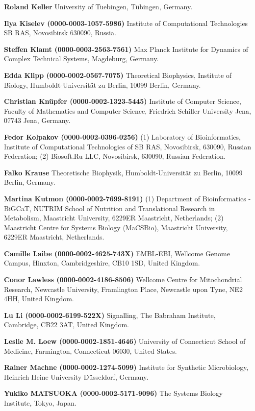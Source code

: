 \documentclass{sbml-paper}
\begin{document}
\textbf{Roland Keller} University of Tuebingen, Tübingen, Germany.

\textbf{Ilya Kiselev (0000-0003-1057-5986)} Institute of Computational Technologies SB RAS, Novosibirsk 630090, Russia.

\textbf{Steffen Klamt (0000-0003-2563-7561)} Max Planck Institute for Dynamics of Complex Technical Systems, Magdeburg, Germany.

\textbf{Edda Klipp (0000-0002-0567-7075)} Theoretical Biophysics, Institute of Biology, Humboldt-Universität zu Berlin, 10099 Berlin, Germany.

\textbf{Christian Knüpfer (0000-0002-1323-5445)} Institute of Computer Science, Faculty of Mathematics and Computer Science, Friedrich Schiller University Jena, 07743 Jena, Germany.

\textbf{Fedor Kolpakov (0000-0002-0396-0256)} (1) Laboratory of Bioinformatics, Institute of Computational Technologies of SB RAS, Novosibirsk, 630090, Russian Federation; (2) Biosoft.Ru LLC, Novosibirsk, 630090, Russian Federation.

\textbf{Falko Krause} Theoretische Biophysik, Humboldt-Universität zu Berlin, 10099 Berlin, Germany.

\textbf{Martina Kutmon (0000-0002-7699-8191)} (1) Department of Bioinformatics - BiGCaT, NUTRIM School of Nutrition and Translational Research in Metabolism, Maastricht University, 6229ER Maastricht, Netherlands; (2) Maastricht Centre for Systems Biology (MaCSBio), Maastricht University, 6229ER Maastricht, Netherlands.

\textbf{Camille Laibe (0000-0002-4625-743X)} EMBL-EBI, Wellcome Genome Campus, Hinxton, Cambridgeshire, CB10 1SD, United Kingdom.

\textbf{Conor Lawless (0000-0002-4186-8506)} Wellcome Centre for Mitochondrial Research, Newcastle University, Framlington Place, Newcastle upon Tyne, NE2 4HH, United Kingdom.

\textbf{Lu Li (0000-0002-6199-522X)} Signalling, The Babraham Institute, Cambridge, CB22 3AT, United Kingdom.

\textbf{Leslie M. Loew (0000-0002-1851-4646)} University of Connecticut School of Medicine, Farmington, Connecticut 06030, United States.

\textbf{Rainer Machne (0000-0002-1274-5099)} Institute for Synthetic Microbiology, Heinrich Heine University Düsseldorf, Germany.

\textbf{Yukiko MATSUOKA (0000-0002-5171-9096)} The Systems Biology Institute, Tokyo, Japan.
\end{document}
